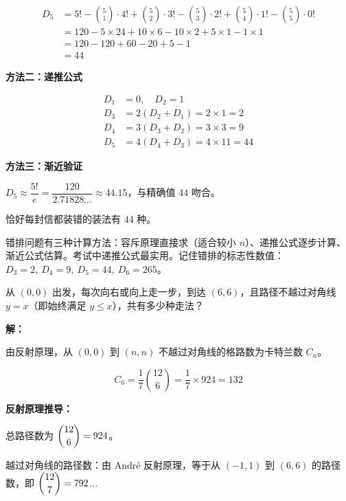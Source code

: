 \documentclass[12pt, a4paper]{ctexart}
\begin{document}
\begin{align*}
D_5 &= 5! - \binom{5}{1}\cdot 4! + \binom{5}{2}\cdot 3! - \binom{5}{3}\cdot 2! + \binom{5}{4}\cdot 1! - \binom{5}{5}\cdot 0! \\
&= 120 - 5\times 24 + 10\times 6 - 10\times 2 + 5\times 1 - 1\times 1 \\
&= 120 - 120 + 60 - 20 + 5 - 1 \\
&= 44
\end{align*}

\textbf{方法二：递推公式}

\begin{align*}
D_1 &= 0,\quad D_2 = 1 \\
D_3 &= 2(D_2+D_1) = 2\times 1 = 2 \\
D_4 &= 3(D_3+D_2) = 3\times 3 = 9 \\
D_5 &= 4(D_4+D_3) = 4\times 11 = 44
\end{align*}

\textbf{方法三：渐近验证}

\(D_5 \approx \dfrac{5!}{e} = \dfrac{120}{2.71828\ldots} \approx 44.15\)，与精确值 \(44\) 吻合。

恰好每封信都装错的装法有 \(\boxed{44}\) 种。

\begin{tipbox}[方法总结]
错排问题有三种计算方法：容斥原理直接求（适合较小 \(n\)）、递推公式逐步计算、渐近公式估算。考试中递推公式最实用。记住错排的标志性数值：\(D_3=2,\ D_4=9,\ D_5=44,\ D_6=265\)。
\end{tipbox}

\vspace{6pt}

\begin{examplebox}
从 \((0,0)\) 出发，每次向右或向上走一步，到达 \((6,6)\)，且路径不越过对角线 \(y=x\)（即始终满足 \(y \le x\)），共有多少种走法？
\end{examplebox}

\textbf{解：}

由反射原理，从 \((0,0)\) 到 \((n,n)\) 不越过对角线的格路数为卡特兰数 \(C_n\)。

\[
C_6 = \frac{1}{7}\binom{12}{6} = \frac{1}{7} \times 924 = \boxed{132}
\]

\textbf{反射原理推导：}

总路径数为 \(\dbinom{12}{6} = 924\)。

越过对角线的路径数：由 Andr\'{e} 反射原理，等于从 \((-1,1)\) 到 \((6,6)\) 的路径数，即 \(\dbinom{12}{7} = 792\)...
\end{document}
